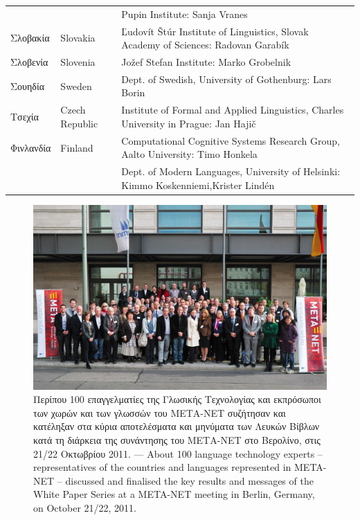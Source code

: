 \begin{longtable}{@{}llp{113mm}@{}}
  & & Pupin Institute: Sanja Vranes \\ \addlinespace  
  Σλοβακία & \textcolor{grey1}{Slovakia} & Ľudovít Štúr Institute of Linguistics, Slovak Academy of Sciences: Radovan Garabík \\ \addlinespace 
  Σλοβενία & \textcolor{grey1}{Slovenia} & Jožef Stefan Institute: Marko Grobelnik \\ \addlinespace 
  Σουηδία & \textcolor{grey1}{Sweden} & Dept. of Swedish, University of Gothenburg: Lars Borin \\ \addlinespace 
  Τσεχία & \textcolor{grey1}{Czech Republic} & Institute of Formal and Applied Linguistics, Charles University in Prague: Jan Hajič \\ \addlinespace
  Φινλανδία & \textcolor{grey1}{Finland} & Computational Cognitive Systems Research Group, Aalto University: Timo Honkela\\ \addlinespace
  & & Dept. of Modern Languages, University of Helsinki: Kimmo Koskenniemi,\newline Krister Lindén 
\end{longtable}
\normalsize

\renewcommand*{\figureformat}{}
\renewcommand*{\captionformat}{}

\begin{figure}[htbp]
  \center
    \includegraphics[width=\textwidth]{../_media/meta-net_team_ebook.jpg}
  \caption{Περίπου 100 επαγγελματίες της Γλωσικής Τεχνολογίας και εκπρόσωποι των χωρών και των γλωσσών του ΜΕΤΑ-ΝΕΤ συζήτησαν και κατέληξαν στα κύρια αποτελέσματα και μηνύματα των Λευκών Βίβλων κατά τη διάρκεια της συνάντησης του ΜΕΤΑ-ΝΕΤ στο Βερολίνο, στις 21/22 Οκτωβρίου 2011. --- \textcolor{grey1}{About 100 language technology experts -- representatives of the countries and languages represented in META-NET -- discussed and finalised the key results and messages of the White Paper Series at a META-NET meeting in Berlin, Germany, on October 21/22, 2011.}}
  \medskip
\end{figure}

